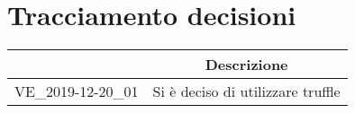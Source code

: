 \section{Tracciamento decisioni}
\renewcommand{\arraystretch}{1.8}

  \begin{longtable}{|p{5cm}|c|}
    \hline

    \rowcolor{header}
    \centering{\textbf{Codice}} &  \textbf{Descrizione}\\

    \hline

    VE\_2019-12-20\_01 & Si è deciso di utilizzare truffle  \\

    \hline
  \end{longtable}
